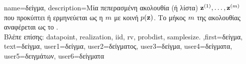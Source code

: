 {name={\foreignlanguage{greek}{δείγμα}},
	description={\foreignlanguage{greek}{Μία} 
		\foreignlanguage{greek}{πεπερασμένη ακολουθία (ή λίστα)}  ${\bf z}^{(1)},\ldots,{\bf z}^{(m)}$ 
		\foreignlanguage{greek}{που προκύπτει ή ερμηνεύεται ως η}  $m$    
		\foreignlanguage{greek}{με κοινή}  $p({\bf z})$. \foreignlanguage{greek}{Το μήκος $m$ της  
		ακολουθίας αναφέρεται ως το} .\\
		\foreignlanguage{greek}{Βλέπε επίσης:} \gls{datapoint}, \gls{realization}, \gls{iid}, \gls{rv}, \gls{probdist}, \gls{samplesize}.
		},first={\foreignlanguage{greek}{δείγμα}},
		text={\foreignlanguage{greek}{δείγμα}},
		user1={\foreignlanguage{greek}{δείγμα}}, %
		user2={\foreignlanguage{greek}{δείγματος}}, %
		user3={\foreignlanguage{greek}{δείγμα}}, %
		user4={\foreignlanguage{greek}{δείγματα}}, %
		user5={\foreignlanguage{greek}{δειγμάτων}}, %
		user6={\foreignlanguage{greek}{δείγματα}} %
}


